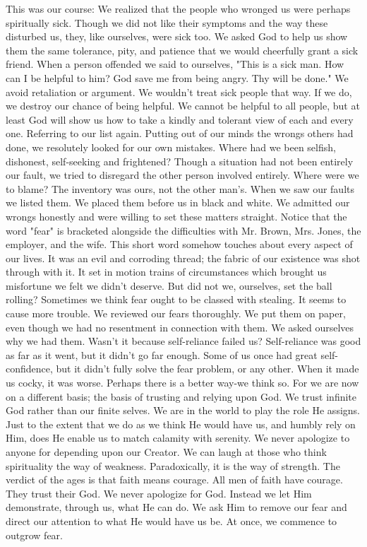 \begin{biblechapter}
This was our course:  We realized that the people who wronged us were perhaps spiritually sick. Though we did not like their symptoms and the way these disturbed us, they, like ourselves, were sick too.  We asked God to help us show them the same tolerance, pity, and patience that we would cheerfully grant a sick friend.  When a person offended we said to ourselves, "This is a sick man.  How can I be helpful to him?  God save me from being angry.  Thy will be done."
We avoid retaliation or argument.  We wouldn't treat sick people that way.  If we do, we destroy our chance of being helpful.  We cannot be helpful to all people, but at least God will show us how to take a kindly and tolerant view of each and every one.
Referring to our list again.  Putting out of our minds the wrongs others had done, we resolutely looked for our own mistakes.  Where had we been selfish, dishonest, self-seeking and frightened?  Though a situation had not been entirely our fault, we tried to disregard the other person involved entirely.  Where were we to blame?  The inventory was ours, not the other man's.  When we saw our faults we listed them.  We placed them before us in black and white.  We admitted our wrongs honestly and were willing to set these matters straight.
Notice that the word "fear" is bracketed alongside the difficulties with Mr. Brown, Mrs. Jones, the employer, and the wife.  This short word somehow touches about every aspect of our lives.  It was an evil and corroding thread; the fabric of our existence was shot through with it.  It set in motion trains of circumstances which brought us misfortune we felt we didn't deserve.  But did not we, ourselves, set the ball rolling?  Sometimes we think fear ought to be classed with stealing.  It seems to cause more trouble.
We reviewed our fears thoroughly.  We put them on paper, even though we had no resentment in connection with them.  We asked ourselves why we had them.  Wasn't it because self-reliance failed us?  Self-reliance was good as far as it went, but it didn't go far enough.  Some of us once had great self-confidence, but it didn't fully solve the fear problem, or any other.  When it made us cocky, it was worse.
Perhaps there is a better way-we think so.  For we are now on a different basis; the basis of trusting and relying upon God.  We trust infinite God rather than our finite selves.  We are in the world to play the role He assigns.  Just to the extent that we do as we think He would have us, and humbly rely on Him, does He enable us to match calamity with serenity.
We never apologize to anyone for depending upon our Creator.  We can laugh at those who think spirituality the way of weakness.  Paradoxically, it is the way of strength.  The verdict of the ages is that faith means courage.  All men of faith have courage.  They trust their God.  We never apologize for God.  Instead we let Him demonstrate, through us, what He can do.  We ask Him to remove our fear and direct our attention to what He would have us be.  At once, we commence to outgrow fear.

\end{biblechapter}
